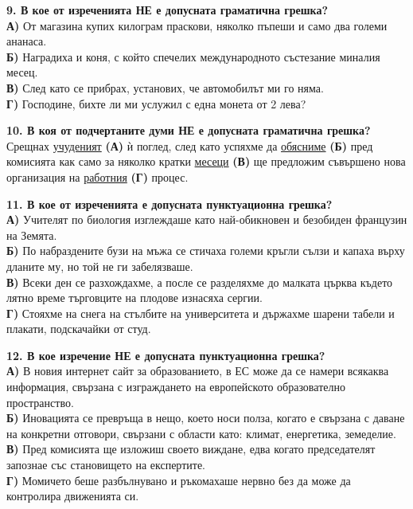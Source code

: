 \documentclass[12pt,a4paper]{article}
\begin{document}
\noindent
\textbf{9. В кое от изреченията НЕ е допусната граматична грешка?} \\
\textbf{А)} От магазина купих килограм праскови, няколко пъпеши и само два големи ананаса. \\
\textbf{Б)} Наградиха и коня, с който спечелих международното състезание миналия месец. \\
\textbf{В)} След като се прибрах, установих, че автомобилът ми го няма. \\
\textbf{Г)} Господине, бихте ли ми услужил с една монета от 2 лева?

\vspace{0.6cm}

\noindent
\textbf{10. В коя от подчертаните думи НЕ е допусната граматична грешка?} \\
Срещнах \underline{учуденият} \textbf{(А)} ѝ поглед, след като успяхме да \underline{обясниме} \textbf{(Б)} пред комисията как само за няколко кратки \underline{месеци} \textbf{(В)} ще предложим съвършено нова организация на \underline{работния} \textbf{(Г)} процес.

\vspace{0.6cm}

\noindent
\textbf{11. В кое от изреченията е допусната пунктуационна грешка?} \\
\textbf{А)} Учителят по биология изглеждаше като най-обикновен и безобиден французин на Земята. \\
\textbf{Б)} По набраздените бузи на мъжа се стичаха големи кръгли сълзи и капаха върху дланите му, но той не ги забелязваше. \\
\textbf{В)} Всеки ден се разхождахме, а после се разделяхме до малката църква където лятно време търговците на плодове изнасяха сергии. \\
\textbf{Г)} Стояхме на снега на стълбите на университета и държахме шарени табели и плакати, подскачайки от студ.

\vspace{0.6cm}

\noindent
\textbf{12. В кое изречение НЕ е допусната пунктуационна грешка?} \\
\textbf{А)} В новия интернет сайт за образованието, в ЕС може да се намери всякаква информация, свързана с изграждането на европейското образователно пространство. \\
\textbf{Б)} Иновацията се превръща в нещо, което носи полза, когато е свързана с даване на конкретни отговори, свързани с области като: климат, енергетика, земеделие. \\
\textbf{В)} Пред комисията ще изложиш своето виждане, едва когато председателят запознае със становището на експертите. \\
\textbf{Г)} Момичето беше разбълнувано и ръкомахаше нервно без да може да контролира движенията си.
\end{document}
